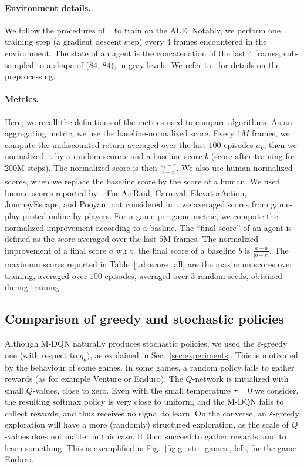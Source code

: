 \documentclass{article}
\begin{document}
\paragraph{Environment details.} We follow the procedures of ~\citet{machado2018revisiting} to train on the ALE. Notably, we perform one training step (a gradient descent step) every $4$ frames encountered in the environment. The state of an agent is the concatenation of the last $4$ frames, sub-sampled to a shape of ($84$, $84$), in gray levels. We refer to~\citet{machado2018revisiting} for details on the preprocessing.

\paragraph{Metrics.} Here, we recall the definitions of the metrics used to compare algorithms. As an aggregating metric, we use the baseline-normalized score. Every $1M$ frames, we compute the undiscounted return averaged over the last $100$ episodes $a_k$, then we normalized it by a random score $r$ and a baseline score $b$ (score after training for 200M steps). The normalized score is then $\frac{a_k - r}{|b - r|}$.  We also use human-normalized scores, when we replace the baseline score by the score of a human. We used human scores reported by~\cite{mnih2015human}. For AirRaid, Carnival, ElevatorAction, JourneyEscape, and Pooyan, not considered in~\citet{mnih2015human}, we averaged scores from game-play posted online by players. 
For a game-per-game metric, we compute the normalized improvement according to a basline. The ``final score'' of an agent is defined as the score averaged over the last $5$M frames. The normalized improvement of a final score $a$ w.r.t. the final score of a baseline $b$ is $\frac{a - b}{|b - r|}$.
The maximum scores reported in Table~\ref{tab:score_all} are the maximum scores over training, averaged over $100$ episodes, averaged over $3$ random seeds, obtained during training.




\subsection{Comparison of greedy and stochastic policies}
\label{subappx:comparison}

Although M-DQN naturally produces stochastic policies, we used the $\varepsilon$-greedy one (with respect to $q_\theta)$, as explained in Sec.~\ref{sec:experiments}. This is motivated by the behaviour of some games. In some games, a random policy fails to gather rewards (as for example Venture or Enduro). The $Q$-network is initialized with small $Q$-values, close to zero. Even with the small temperature $\tau=0$ we consider, the resulting softmax policy is very close to uniform, and the M-DQN fails to collect rewards, and thus receives no signal to learn. On the converse, an $\varepsilon$-greedy exploration will have a more (randomly) structured exploration, as the scale of $Q$-values does not matter in this case. It then succeed to gather rewards, and to learn something. This is exemplified in Fig.~\ref{fig:g_sto_games}, left, for the game Enduro.
\end{document}
